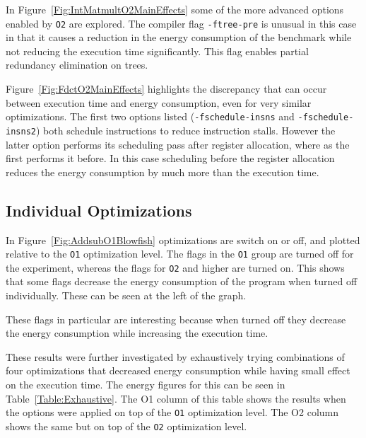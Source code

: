 \documentclass[twocolumn]{article}
\newcommand{\todo}[1]{\textbf{\textcolor{red}{#1}}}
\begin{document}
In Figure~\ref{Fig:IntMatmultO2MainEffects} some of the more advanced options enabled by \texttt{O2} are explored. The compiler flag \texttt{-ftree-pre} is unusual in this case in that it causes a reduction in the energy consumption of the benchmark while not reducing the execution time significantly. This flag enables partial redundancy elimination on trees.

Figure~\ref{Fig:FdctO2MainEffects} highlights the discrepancy that can occur between execution time and energy consumption, even for very similar optimizations. The first two options listed (\texttt{-fschedule-insns} and \texttt{-fschedule-insns2}) both schedule instructions to reduce instruction stalls. However the latter option performs its scheduling pass after register allocation, where as the first performs it before. In this case scheduling before the register allocation reduces the energy consumption by much more than the execution time.


\subsection{Individual Optimizations}

In Figure~\ref{Fig:AddsubO1Blowfish} optimizations are switch on or off, and plotted relative to the \texttt{O1} optimization level. The flags in the \texttt{O1} group are turned off for the experiment, whereas the flags for \texttt{O2} and higher are turned on. This shows that some flags decrease the energy consumption of the program when turned off individually. These can be seen at the left of the graph.

These flags in particular are interesting because when turned off they decrease the energy consumption while increasing the execution time.

These results were further investigated by exhaustively trying combinations of four optimizations that decreased energy consumption while having small effect on the execution time. The energy figures for this can be seen in Table~\ref{Table:Exhaustive}. The O1 column of this table shows the results when the options were applied on top of the \texttt{O1} optimization level. The O2 column shows the same but on top of the \texttt{O2} optimization level.
\end{document}
